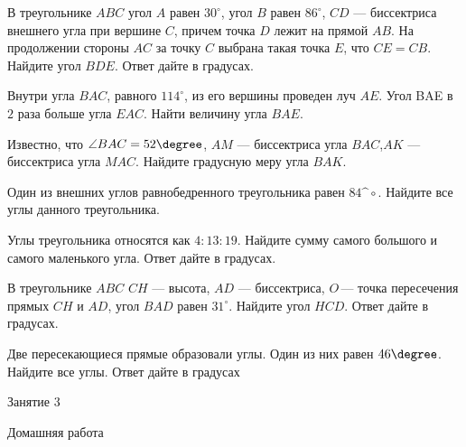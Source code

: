 \begin{class}[number=2]
\begin{listofex}
		\item В треугольнике \( ABC \) угол \( A \) равен \( 30^{\circ} \), угол \( B \) равен \( 86^{\circ} \), \( CD \)  — биссектриса внешнего угла при вершине \( C \), причем точка \( D \) лежит на прямой \( AB \). На продолжении стороны \( AC \) за точку \( C  \) выбрана такая точка \( E \), что \( CE  =  CB \). Найдите угол \( BDE \). Ответ дайте в градусах.
		\item Внутри угла \( BAC \), равного \( 114^{\circ} \), из его вершины проведен луч \( AE \). Угол BAE в \( 2 \) раза больше угла \( EAC \). Найти величину угла \( BAE \). 
	\end{listofex}
\end{class}

\begin{homework}[number=2]
	\begin{listofex}
		\item Известно, что  \( \angle BAC = 52\degree \), \( AM \) — биссектриса угла \( BAC \),\( AK \) — биссектриса угла \(  MAC \). Найдите градусную меру угла \( BAK \).
		\item Один из внешних углов равнобедренного треугольника равен \( 84\^{\circ} \). Найдите все углы данного треугольника.
		\item Углы треугольника относятся как \(  4:13:19 \). Найдите сумму самого большого и самого маленького угла. Ответ дайте в градусах.
		\item В треугольнике \( ABC \) \( CH \)  — высота, \( AD \)  — биссектриса, \( O \) — точка пересечения прямых \( CH \) и \( AD \), угол \( BAD \) равен \( 31^{\circ} \). Найдите угол \( HCD \). Ответ дайте в градусах.
		\item Две пересекающиеся прямые образовали углы. Один из них равен \( 46\degree \). Найдите все углы. Ответ дайте в градусах
	\end{listofex}
\end{homework}

\begin{class}[number=3]
	\begin{listofex}
		\item Занятие 3
	\end{listofex}
\end{class}

\begin{homework}[number=3]
	\begin{listofex}
		\item Домашняя работа
	\end{listofex}
\end{homework}

